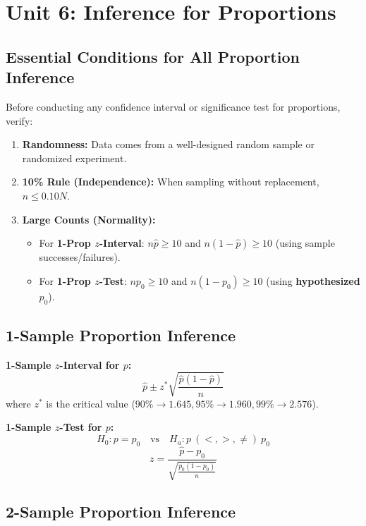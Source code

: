 \chapter{Unit 6: Inference for Proportions}

\section{Essential Conditions for All Proportion Inference}

Before conducting any confidence interval or significance test for proportions, verify:
\begin{enumerate}
    \item \textbf{Randomness:} Data comes from a well-designed random sample or randomized experiment.
    \item \textbf{10\% Rule (Independence):} When sampling without replacement, $n \le 0.10N$.
    \item \textbf{Large Counts (Normality):}
    \begin{itemize}
        \item For \textbf{1-Prop $z$-Interval}: $n\hat{p} \ge 10$ and $n(1-\hat{p}) \ge 10$ (using sample successes/failures).
        \item For \textbf{1-Prop $z$-Test}: $np_0 \ge 10$ and $n(1-p_0) \ge 10$ (using \textbf{hypothesized} $p_0$).
    \end{itemize}
\end{enumerate}

\section{1-Sample Proportion Inference}

\begin{formulabox}
\textbf{1-Sample $z$-Interval for $p$:}
\[
\hat{p} \pm z^* \sqrt{\frac{\hat{p}(1-\hat{p})}{n}}
\]
where $z^*$ is the critical value ($90\% \to 1.645, 95\% \to 1.960, 99\% \to 2.576$).

\textbf{1-Sample $z$-Test for $p$:}
\[
H_0: p = p_0 \quad \text{vs} \quad H_a: p \ (<, >, \ne) \ p_0
\]
\[
z = \frac{\hat{p} - p_0}{\sqrt{\frac{p_0(1-p_0)}{n}}}
\]
\end{formulabox}

\section{2-Sample Proportion Inference}

